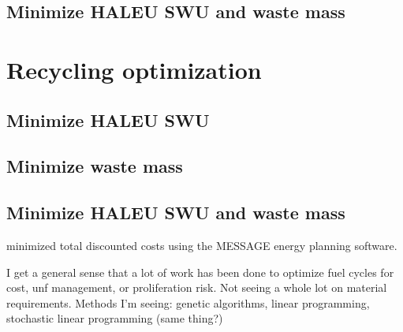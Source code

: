\subsection{Minimize HALEU SWU and waste mass}

\section{Recycling optimization}
\subsection{Minimize HALEU SWU}

\subsection{Minimize waste mass}

\subsection{Minimize HALEU SWU and waste mass}



\cite{andrianov_optimization_2019} minimized total discounted costs using 
the MESSAGE energy planning software. 

I get a general sense that a lot of work has been done to optimize fuel cycles 
for cost, unf management, or proliferation risk. Not seeing a whole lot on 
material requirements. 
Methods I'm seeing: genetic algorithms, linear programming, stochastic linear 
programming (same thing?)
